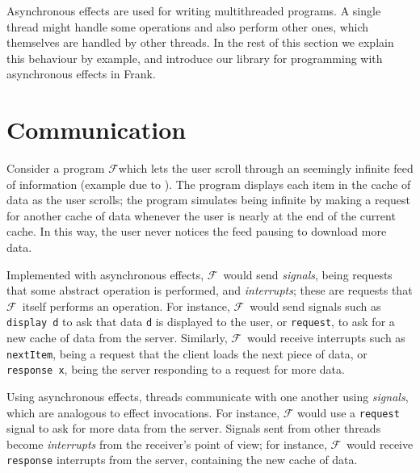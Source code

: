 \documentclass[msc,deptreport,cs]{infthesis} %
\newcommand{\code}[1]{\lstinline{#1}}
\newcommand\feed{$\mathcal{F}$}
\newcommand{\todo}[1]
           {{\par\noindent\small\color{RoyalPurple}
  \framebox{\parbox{\dimexpr\linewidth-2\fboxsep-2\fboxrule}
    {\textbf{TODO:} #1}}}}
\begin{document}
Asynchronous effects are used for writing multithreaded programs. A single
thread might handle some operations and also perform other ones, which
themselves are handled by other threads. In the rest of this section we explain
this behaviour by example, and introduce our library for programming with
asynchronous effects in Frank.

%


\section{Communication}

Consider a program \feed which lets the user scroll through an seemingly
infinite feed of information (example due to
\citeauthor{ahman2020asynchronous}). The program displays each item in the cache
of data as the user scrolls; the program simulates being infinite by
making a request for another cache of data whenever the user is nearly at the
end of the current cache. In this way, the user never notices the feed pausing
to download more data.

Implemented with asynchronous effects, \feed~would send \emph{signals}, being
requests that some abstract operation is performed, and \emph{interrupts}; these
are requests that \feed~itself performs an operation. For instance, \feed~would
send signals such as \code{display d} to ask that data \code{d} is displayed to
the user, or \code{request}, to ask for a new cache of data from the server.
Similarly, \feed~would receive interrupts such as \code{nextItem}, being a
request that the client loads the next piece of data, or \code{response x},
being the server responding to a request for more data.




Using asynchronous effects, threads communicate with one another using
\emph{signals}, which are analogous to effect invocations. For instance, \feed
would use a \code{request} signal to ask for more data from the server. Signals
sent from other threads become \emph{interrupts} from the receiver's point of
view; for instance, \feed~would receive \code{response} interrupts from the
server, containing the new cache of data.
\end{document}
